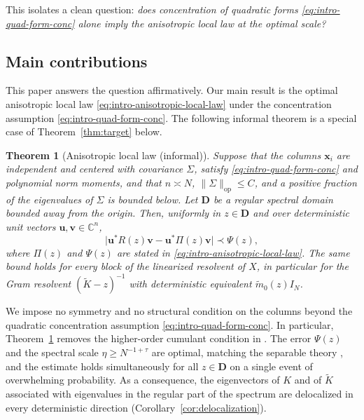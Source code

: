 \documentclass[11pt,reqno]{amsart}
\def\u{\mathbf{u}}
\def\bv{\mathbf{v}}
\def\x{\mathbf{x}}
\def\C{\mathbb{C}}
\def\bD{\mathbf{D}}
\def\op{\mathrm{op}}
\newtheorem{theorem}{Theorem}[section]
\theoremstyle{definition}
\numberwithin{equation}{section}
\numberwithin{figure}{section}
\begin{document}
This isolates a clean question: \emph{does concentration of quadratic forms \eqref{eq:intro-quad-form-conc} alone imply the anisotropic local law at the optimal scale?}





\subsection{Main contributions} 


This paper answers the question affirmatively. Our main result is the optimal anisotropic local law \eqref{eq:intro-anisotropic-local-law} under the concentration assumption \eqref{eq:intro-quad-form-conc}. The following informal theorem is a special case of Theorem~\ref{thm:target} below.

\begin{theorem}[Anisotropic local law (informal)]\label{thm:informal}
Suppose that the columns $\x_i$ are independent and centered with covariance $\Sigma$, satisfy \eqref{eq:intro-quad-form-conc} and polynomial norm moments, and that $n\asymp N$, $\|\Sigma\|_\op\le C$, and a positive fraction of the eigenvalues of $\Sigma$ is bounded below. Let $\bD$ be a regular spectral domain bounded away from the origin. Then, uniformly in $z\in\bD$ and over deterministic unit vectors $\u,\bv\in\C^n$,
\[
 \big|\u^*R(z)\bv-\u^*\Pi(z)\bv\big|\prec\Psi(z),
\]
where $\Pi(z)$ and $\Psi(z)$ are stated in \eqref{eq:intro-anisotropic-local-law}.
The same bound holds for every block of the linearized resolvent of $X$, in particular for the Gram resolvent $(\widetilde K-z)^{-1}$ with deterministic equivalent $\widetilde m_0(z)I_N$.
\end{theorem}

We impose no symmetry and no structural condition on the columns beyond the quadratic concentration assumption \eqref{eq:intro-quad-form-conc}. In particular, Theorem~\ref{thm:informal} removes the higher-order cumulant condition in \cite[Theorem~2.8]{fan2026anisotropic}. The error $\Psi(z)$ and the spectral scale $\eta\ge N^{-1+\tau}$ are optimal, matching the separable theory \cite{knowles2017anisotropic}, and the estimate holds simultaneously for all $z\in\bD$ on a single event of overwhelming probability. As a consequence, the eigenvectors of $K$ and of $\widetilde K$ associated with eigenvalues in the regular part of the spectrum are delocalized in every deterministic direction (Corollary~\ref{cor:delocalization}). 
\end{document}
